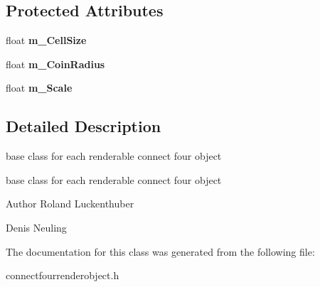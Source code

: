 \subsection*{\-Protected \-Attributes}
\begin{DoxyCompactItemize}
\item 
\hypertarget{classConnectFourRenderObject_a507319d76cc95bd30ca5a8e4e5e4e5c6}{float {\bfseries m\-\_\-\-Cell\-Size}}\label{classConnectFourRenderObject_a507319d76cc95bd30ca5a8e4e5e4e5c6}

\item 
\hypertarget{classConnectFourRenderObject_afa3cd5255b779a30c8f8a3615f5a6c14}{float {\bfseries m\-\_\-\-Coin\-Radius}}\label{classConnectFourRenderObject_afa3cd5255b779a30c8f8a3615f5a6c14}

\item 
\hypertarget{classConnectFourRenderObject_aa864124c16d148218a340af0340d6ddf}{float {\bfseries m\-\_\-\-Scale}}\label{classConnectFourRenderObject_aa864124c16d148218a340af0340d6ddf}

\end{DoxyCompactItemize}


\subsection{\-Detailed \-Description}
base class for each renderable connect four object 

base class for each renderable connect four object

\begin{DoxyAuthor}{\-Author}
\-Roland \-Luckenthuber 

\-Denis \-Neuling 
\end{DoxyAuthor}


\-The documentation for this class was generated from the following file\-:\begin{DoxyCompactItemize}
\item 
connectfourrenderobject.\-h\end{DoxyCompactItemize}
